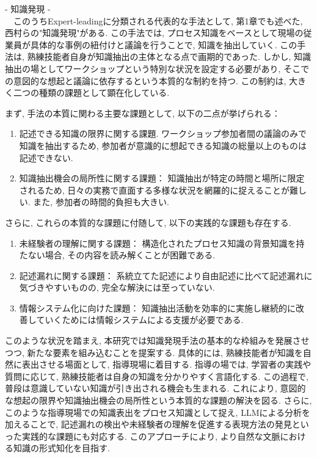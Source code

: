 - 知識発現 -\\
　このうちExpert-leadingに分類される代表的な手法として, 第1章でも述べた, 西村らの"知識発現"\cite{Nishimura2017}がある. この手法では, プロセス知識をベースとして現場の従業員が具体的な事例の紐付けと議論を行うことで, 知識を抽出していく. この手法は, 熟練技能者自身が知識抽出の主体となる点で画期的であった. しかし, 知識抽出の場としてワークショップという特別な状況を設定する必要があり, そこでの意図的な想起と議論に依存するという本質的な制約を持つ. この制約は, 大きく二つの種類の課題として顕在化している. 

まず, 手法の本質に関わる主要な課題として, 以下の二点が挙げられる：

\begin{enumerate}
    \item 記述できる知識の限界に関する課題.
    ワークショップ参加者間の議論のみで知識を抽出するため, 参加者が意識的に想起できる知識の総量以上のものは記述できない. 
    
    \item 知識抽出機会の局所性に関する課題：
    知識抽出が特定の時間と場所に限定されるため, 日々の実務で直面する多様な状況を網羅的に捉えることが難しい. また, 参加者の時間的負担も大きい.
\end{enumerate}

さらに, これらの本質的な課題に付随して, 以下の実践的な課題も存在する.

\begin{enumerate}
    \item 未経験者の理解に関する課題：
    構造化されたプロセス知識の背景知識を持たない場合, その内容を読み解くことが困難である. 
    
    \item 記述漏れに関する課題：
    系統立てた記述により自由記述に比べて記述漏れに気づきやすいものの, 完全な解決には至っていない. 
    
    \item 情報システム化に向けた課題：
    知識抽出活動を効率的に実施し継続的に改善していくためには情報システムによる支援が必要である. 
\end{enumerate}

このような状況を踏まえ, 本研究では知識発現手法の基本的な枠組みを発展させつつ, 新たな要素を組み込むことを提案する. 具体的には, 熟練技能者が知識を自然に表出させる場面として, 指導現場に着目する. 指導の場では, 学習者の実践や質問に応じて, 熟練技能者は自身の知識を分かりやすく言語化する. この過程で, 普段は意識していない知識が引き出される機会も生まれる. これにより, 意図的な想起の限界や知識抽出機会の局所性という本質的な課題の解決を図る. さらに, このような指導現場での知識表出をプロセス知識として捉え, LLMによる分析を加えることで, 記述漏れの検出や未経験者の理解を促進する表現方法の発見といった実践的な課題にも対応する. このアプローチにより, より自然な文脈における知識の形式知化を目指す.

